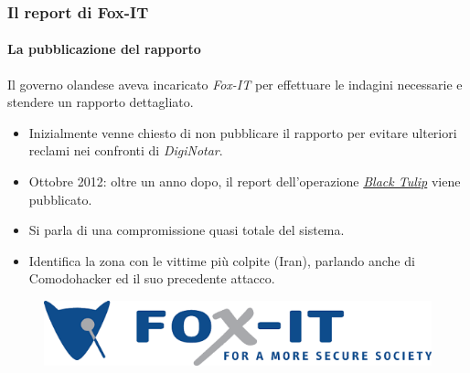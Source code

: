 \documentclass{beamer}
\begin{document}
\begin{frame}
\frametitle{Il report di Fox-IT}
\framesubtitle{La pubblicazione del rapporto}
Il governo olandese aveva incaricato \alert{\textit{Fox-IT}} per effettuare le indagini necessarie e stendere un rapporto dettagliato.

\begin{itemize}
	\item Inizialmente venne chiesto di non pubblicare il rapporto per evitare ulteriori reclami nei confronti di \textit{DigiNotar}.
	\item \alert{Ottobre 2012}: oltre un anno dopo, il \alert{report} dell'operazione \href{https://cryptosense.com/wp-content/uploads/2014/11/black-tulip-update.pdf}{\alert{\textit{Black Tulip}}} viene \alert{pubblicato}.
	\item Si parla di una compromissione quasi totale del sistema.
	\item Identifica la zona con le vittime più colpite (\alert{Iran}), parlando anche di \alert{Comodohacker} ed il suo precedente attacco.
\end{itemize}
	\begin{figure}[H]
		\centering
		\includegraphics[scale=0.35]{foxit}
	\end{figure}
\end{frame}
\end{document}
